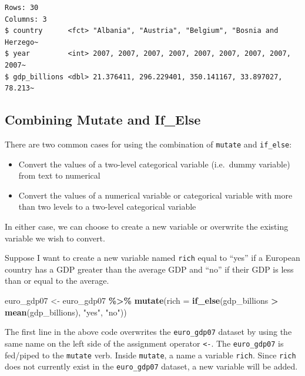 \documentclass[
]{book}
\makeatletter
\newenvironment{Shaded}{\begin{snugshade}}{\end{snugshade}}
\newcommand{\AttributeTok}[1]{\textcolor[rgb]{0.27,0.27,0.27}{#1}}
\newcommand{\FunctionTok}[1]{\textcolor[rgb]{0.27,0.27,0.27}{\textbf{#1}}}
\newcommand{\NormalTok}[1]{#1}
\newcommand{\OtherTok}[1]{\textcolor[rgb]{0.37,0.37,0.37}{#1}}
\newcommand{\SpecialCharTok}[1]{\textcolor[rgb]{0.43,0.43,0.43}{\textbf{#1}}}
\newcommand{\StringTok}[1]{\textcolor[rgb]{0.5,0.5,0.5}{#1}}
\providecommand{\tightlist}{%
  \setlength{\itemsep}{0pt}\setlength{\parskip}{0pt}}
\newenvironment{kframe}{%
\medskip{}
\setlength{\fboxsep}{.8em}
 \def\at@end@of@kframe{}%
 \ifinner\ifhmode%
  \def\at@end@of@kframe{\end{minipage}}%
  \begin{minipage}{\columnwidth}%
 \fi\fi%
 \def\FrameCommand##1{\hskip\@totalleftmargin \hskip-\fboxsep
 \colorbox{shadecolor}{##1}\hskip-\fboxsep
     \hskip-\linewidth \hskip-\@totalleftmargin \hskip\columnwidth}%
 \MakeFramed {\advance\hsize-\width
   \@totalleftmargin\z@ \linewidth\hsize
   \@setminipage}}%
 {\par\unskip\endMakeFramed%
 \at@end@of@kframe}
\renewenvironment{Shaded}{\begin{kframe}}{\end{kframe}}
\makeatother
\begin{document}
\begin{verbatim}
Rows: 30
Columns: 3
$ country      <fct> "Albania", "Austria", "Belgium", "Bosnia and Herzego~
$ year         <int> 2007, 2007, 2007, 2007, 2007, 2007, 2007, 2007, 2007~
$ gdp_billions <dbl> 21.376411, 296.229401, 350.141167, 33.897027, 78.213~
\end{verbatim}

\hypertarget{combining-mutate-and-if_else}{%
\subsection{Combining Mutate and If\_Else}\label{combining-mutate-and-if_else}}

There are two common cases for using the combination of \texttt{mutate} and \texttt{if\_else}:

\begin{itemize}
\tightlist
\item
  Convert the values of a two-level categorical variable (i.e.~dummy variable) from text to numerical
\item
  Convert the values of a numerical variable or categorical variable with more than two levels to a two-level categorical variable
\end{itemize}

In either case, we can choose to create a new variable or overwrite the existing variable we wish to convert.

Suppose I want to create a new variable named \texttt{rich} equal to ``yes'' if a European country has a GDP greater than the average GDP and ``no'' if their GDP is less than or equal to the average.

\begin{Shaded}
\begin{Highlighting}[]
\NormalTok{euro\_gdp07 }\OtherTok{\textless{}{-}}\NormalTok{ euro\_gdp07 }\SpecialCharTok{\%\textgreater{}\%} 
  \FunctionTok{mutate}\NormalTok{(}\AttributeTok{rich =} \FunctionTok{if\_else}\NormalTok{(gdp\_billions }\SpecialCharTok{\textgreater{}} \FunctionTok{mean}\NormalTok{(gdp\_billions), }\StringTok{"yes"}\NormalTok{, }\StringTok{"no"}\NormalTok{))}
\end{Highlighting}
\end{Shaded}

The first line in the above code overwrites the \texttt{euro\_gdp07} dataset by using the same name on the left side of the assignment operator \texttt{\textless{}-}. The \texttt{euro\_gdp07} is fed/piped to the \texttt{mutate} verb. Inside \texttt{mutate}, a name a variable \texttt{rich}. Since \texttt{rich} does not currently exist in the \texttt{euro\_gdp07} dataset, a new variable will be added.
\end{document}
